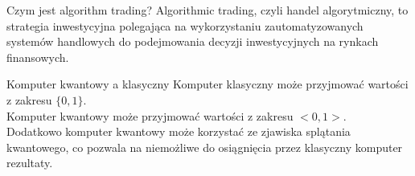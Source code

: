 
\begin{frame}{Czym jest algorithm trading?}
  Algorithmic trading, czyli handel algorytmiczny, to strategia inwestycyjna polegająca na wykorzystaniu zautomatyzowanych systemów handlowych do podejmowania decyzji inwestycyjnych na rynkach finansowych.
\end{frame}

\begin{frame}{Komputer kwantowy a klasyczny}
  Komputer klasyczny może przyjmować wartości z zakresu $\{0, 1\}$.\\ \pause
  Komputer kwantowy może przyjmować wartości z zakresu $<0, 1>$.\\ \pause
  Dodatkowo komputer kwantowy może korzystać ze zjawiska splątania kwantowego, co pozwala na niemożliwe do osiągnięcia przez klasyczny komputer rezultaty.
\end{frame}

